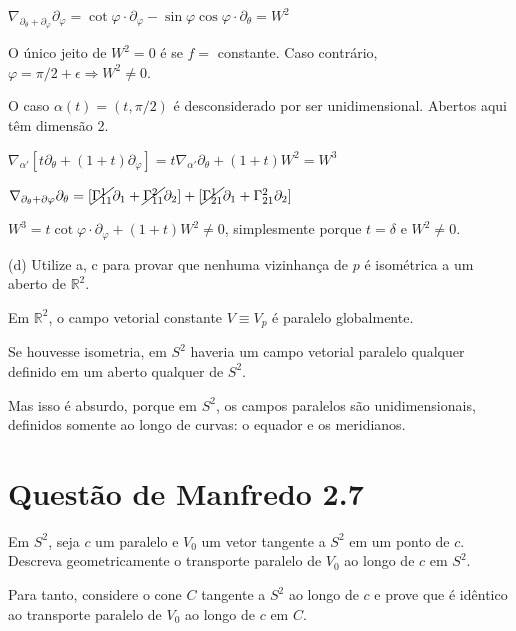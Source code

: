 \documentclass[10pt,a4paper]{article}
\begin{document}
		$\nabla_{\partial_\theta + \partial_\varphi} \partial_\varphi = \cot \varphi \cdot \partial_\varphi - \sin \varphi \cos \varphi \cdot \partial_\theta = W^2$

		O \'unico jeito de $W^2 = 0$ \'e se $f =$ constante. Caso contr\'ario, $\varphi = \pi/2 + \epsilon \Rightarrow W^2 \ne 0$.

		O caso $\alpha(t) = (t, \pi/2)$ \'e desconsiderado por ser unidimensional. Abertos aqui t\^em dimens\~ao 2.

		$\nabla_{\alpha'} [t \partial_\theta + (1 + t) \partial_\varphi] = t \nabla_{\alpha'} \partial_\theta + (1 + t) W^2 = W^3$

		$\nabla_{\partial_\theta + \partial \varphi} \partial_\theta = [\cancel{\Gamma_{11}^1} \partial_1 + \cancel{\Gamma_{11}^2} \partial_2] + [\cancel{\Gamma_{21}^1} \partial_1 + \Gamma_{21}^2 \partial_2]$

		$W^3 = t \cot \varphi \cdot \partial_\varphi  + (1 + t) W^2 \ne 0$, simplesmente porque $t = \delta$ e $W^2 \ne 0$.

		\vspace{3mm}

		(d) Utilize a, c para provar que nenhuma vizinhan\c{c}a de $p$ \'e isom\'etrica a um aberto de $\mathbb{R}^2$.

		Em $\mathbb{R}^2$, o campo vetorial constante $V \equiv V_p$ \'e paralelo globalmente.

		Se houvesse isometria, em $S^2$ haveria um campo vetorial paralelo qualquer definido em um aberto qualquer de $S^2$.

		Mas isso \'e absurdo, porque em $S^2$, os campos paralelos s\~ao unidimensionais, definidos somente ao longo de curvas: o equador e os meridianos.

	\section{Quest\~ao de Manfredo 2.7}
		\begin{flushright}
		\end{flushright}

		Em $S^2$, seja $c$ um paralelo e $V_0$ um vetor tangente a $S^2$ em um ponto de $c$. Descreva geometricamente o transporte paralelo de $V_0$ ao longo de $c$ em $S^2$.

		Para tanto, considere o cone $C$ tangente a $S^2$ ao longo de $c$ e prove que \'e id\^entico ao transporte paralelo de $V_0$ ao longo de $c$ em $C$.

		\vspace{3mm}
\end{document}
